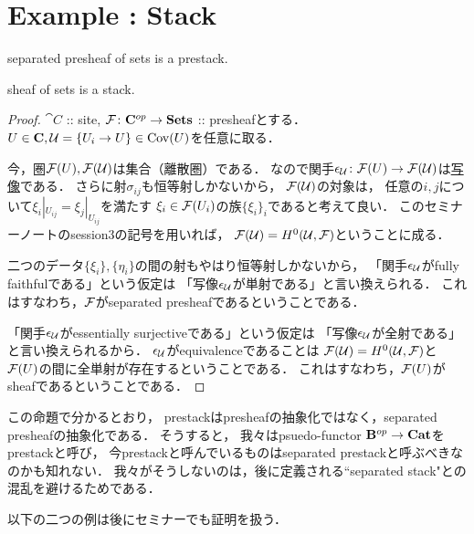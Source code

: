 \documentclass[a4paper]{jsarticle}
\begin{document}
\section{Example : Stack}
\begin{Prop}
    \begin{myenum}
        \item separated presheaf of sets is a prestack.
        \item sheaf of sets is a stack.
    \end{myenum}
\end{Prop}
\begin{proof}
    $\cat{C}$ :: site, $\mathcal{F} \colon \mathbf{C}^{op} \to \mathbf{Sets}$ :: presheafとする．
    $U \in \mathbf{C}, \mathcal{U}=\{U_i \to U\} \in \operatorname{Cov}(U)$を任意に取る．

    今，圏$\mathcal{F}(U), \mathcal{F}(\mathcal{U})$は集合（離散圏）である．
    なので関手$\epsilon_{\mathcal{U}} \colon \mathcal{F}(U) \to \mathcal{F}(\mathcal{U})$は\underline{写像}である．
    さらに射$\sigma_{ij}$も恒等射しかないから，
    $\mathcal{F}(\mathcal{U})$の対象は，
    任意の$i,j$について$\xi_i|_{U_{ij}}=\xi_j|_{U_{ij}}$を満たす
    $\xi_i \in \mathcal{F}(U_i)$の族$\{\xi_i\}_i$であると考えて良い．
    このセミナーノートのsession3の記号を用いれば，
    $\mathcal{F}(\mathcal{U})=H^0(\mathcal{U}, \mathcal{F})$ということに成る．

    二つのデータ$\{\xi_i\}, \{\eta_i\}$の間の射もやはり恒等射しかないから，
    「関手$\epsilon_{\mathcal{U}}$がfully faithfulである」という仮定は
    「写像$\epsilon_{\mathcal{U}}$が単射である」と言い換えられる．
    これはすなわち，$\mathcal{F}$がseparated presheafであるということである．

    「関手$\epsilon_{\mathcal{U}}$がessentially surjectiveである」という仮定は
    「写像$\epsilon_{\mathcal{U}}$が全射である」と言い換えられるから．
    $\epsilon_{\mathcal{U}}$がequivalenceであることは
    $\mathcal{F}(\mathcal{U})=H^0(\mathcal{U}, \mathcal{F})$と$\mathcal{F}(U)$の間に全単射が存在するということである．
    これはすなわち，$\mathcal{F}(U)$がsheafであるということである．
\end{proof}

\begin{Remark}
    この命題で分かるとおり，
    prestackはpresheafの抽象化ではなく，separated presheafの抽象化である．
    そうすると，
    我々はpsuedo-functor $\mathbf{B}^{op} \to \mathbf{Cat}$をprestackと呼び，
    今prestackと呼んでいるものはseparated prestackと呼ぶべきなのかも知れない．
    我々がそうしないのは，後に定義される``separated stack"との混乱を避けるためである．
\end{Remark}

以下の二つの例は後にセミナーでも証明を扱う．
\end{document}

